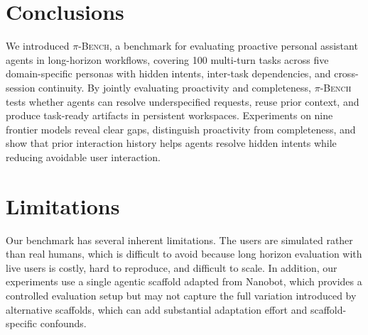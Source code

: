 \documentclass{llmxive}
\providecommand{\bench}{\textsc{$\pi$-Bench}}
\begin{document}
\section{Conclusions}
\label{sec:conclusions}

We introduced {\bench}, a benchmark for evaluating proactive personal assistant agents in long-horizon workflows, covering 100 multi-turn tasks across five domain-specific personas with hidden intents, inter-task dependencies, and cross-session continuity. By jointly evaluating proactivity and completeness, {\bench} tests whether agents can resolve underspecified requests, reuse prior context, and produce task-ready artifacts in persistent workspaces.
Experiments on nine frontier models reveal clear gaps, distinguish proactivity from completeness, and show that prior interaction history helps agents resolve hidden intents while reducing avoidable user interaction.

\section{Limitations}
\label{sec:limitations}

Our benchmark has several inherent limitations. The users are simulated rather than real humans, which is difficult to avoid because long horizon evaluation with live users is costly, hard to reproduce, and difficult to scale.
In addition, our experiments use a single agentic scaffold adapted from Nanobot, which provides a controlled evaluation setup but may not capture the full variation introduced by alternative scaffolds, which can add substantial adaptation effort and scaffold-specific confounds.

{\small


}



\appendix
\end{document}
